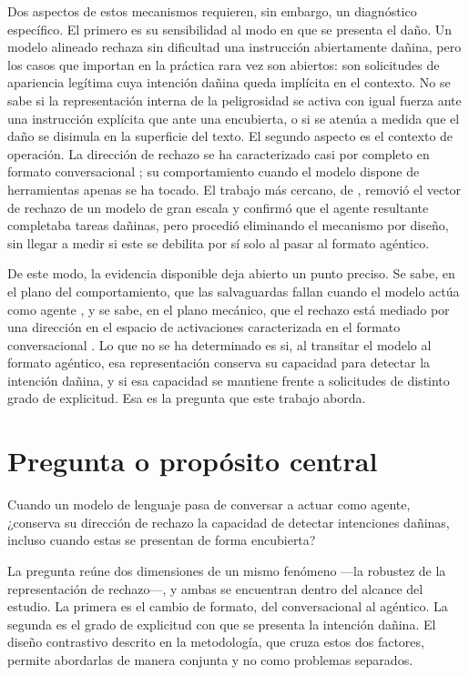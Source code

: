Dos aspectos de estos mecanismos requieren, sin embargo, un diagnóstico específico. El primero es su sensibilidad al modo en que se presenta el daño. Un modelo alineado rechaza sin dificultad una instrucción abiertamente dañina, pero los casos que importan en la práctica rara vez son abiertos: son solicitudes de apariencia legítima cuya intención dañina queda implícita en el contexto. No se sabe si la representación interna de la peligrosidad se activa con igual fuerza ante una instrucción explícita que ante una encubierta, o si se atenúa a medida que el daño se disimula en la superficie del texto. El segundo aspecto es el contexto de operación. La dirección de rechazo se ha caracterizado casi por completo en formato conversacional \parencite{arditi2024}; su comportamiento cuando el modelo dispone de herramientas apenas se ha tocado. El trabajo más cercano, de \textcite{lermen2024}, removió el vector de rechazo de un modelo de gran escala y confirmó que el agente resultante completaba tareas dañinas, pero procedió eliminando el mecanismo por diseño, sin llegar a medir si este se debilita por sí solo al pasar al formato agéntico.

De este modo, la evidencia disponible deja abierto un punto preciso. Se sabe, en el plano del comportamiento, que las salvaguardas fallan cuando el modelo actúa como agente \parencite{andriushchenko2024}, y se sabe, en el plano mecánico, que el rechazo está mediado por una dirección en el espacio de activaciones caracterizada en el formato conversacional \parencite{arditi2024}. Lo que no se ha determinado es si, al transitar el modelo al formato agéntico, esa representación conserva su capacidad para detectar la intención dañina, y si esa capacidad se mantiene frente a solicitudes de distinto grado de explicitud. Esa es la pregunta que este trabajo aborda.

\section{Pregunta o propósito central}
\label{sec:pregunta}

Cuando un modelo de lenguaje pasa de conversar a actuar como agente, ¿conserva su dirección de rechazo la capacidad de detectar intenciones dañinas, incluso cuando estas se presentan de forma encubierta?

La pregunta reúne dos dimensiones de un mismo fenómeno —la robustez de la representación de rechazo—, y ambas se encuentran dentro del alcance del estudio. La primera es el cambio de formato, del conversacional al agéntico. La segunda es el grado de explicitud con que se presenta la intención dañina. El diseño contrastivo descrito en la metodología, que cruza estos dos factores, permite abordarlas de manera conjunta y no como problemas separados.


